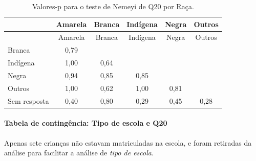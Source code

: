 \documentclass[]{article}
\let\oldparagraph\paragraph
\renewcommand{\paragraph}[1]{\oldparagraph{#1}\mbox{}}
\begin{document}
\begin{longtable}[]{@{}lccccc@{}}
\caption{\label{tab:unnamed-chunk-406}Valores-p para o teste de Nemeyi de Q20 por Raça.}\tabularnewline
\toprule
& Amarela & Branca & Indígena & Negra & Outros\tabularnewline
\midrule
\endfirsthead
\toprule
& Amarela & Branca & Indígena & Negra & Outros\tabularnewline
\midrule
\endhead
Branca & 0,79 & & & &\tabularnewline
Indígena & 1,00 & 0,64 & & &\tabularnewline
Negra & 0,94 & 0,85 & 0,85 & &\tabularnewline
Outros & 1,00 & 0,62 & 1,00 & 0,81 &\tabularnewline
Sem resposta & 0,40 & 0,80 & 0,29 & 0,45 & 0,28\tabularnewline
\bottomrule
\end{longtable}

\cleardoublepage

\hypertarget{tabela-de-continguxeancia-tipo-de-escola-e-q20}{%
\paragraph{Tabela de contingência: Tipo de escola e Q20}\label{tabela-de-continguxeancia-tipo-de-escola-e-q20}}

Apenas sete crianças não estavam matriculadas na escola, e foram retiradas da análise para facilitar a análise de \emph{tipo de escola}.
\end{document}
